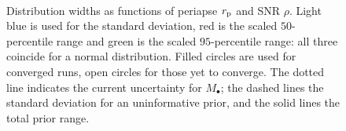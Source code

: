\begin{figure}[!htp]
\begin{center}
 \\
 \quad
{}
\caption{Distribution widths as functions of periapse $r_\mathrm{p}$ and SNR $\rho$. Light blue is used for the standard deviation, red is the scaled $50$-percentile range and green is the scaled $95$-percentile range: all three coincide for a normal distribution. Filled circles are used for converged runs, open circles for those yet to converge. The dotted line indicates the current uncertainty for $M_\bullet$; the dashed lines the standard deviation for an uninformative prior, and the solid lines the total prior range.\label{fig:sigmas}}
\end{center}
\end{figure}
